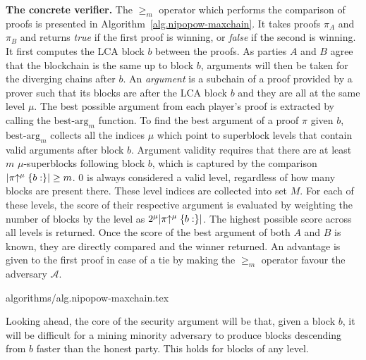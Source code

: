 \noindent
\textbf{The concrete verifier.}
The $\geq_m$ operator which performs the comparison of proofs is presented in
Algorithm~\ref{alg.nipopow-maxchain}. It takes proofs $\pi_A$ and $\pi_B$ and
returns \emph{true} if the first proof is winning, or \emph{false} if the second
is winning. It first computes the LCA block $b$ between the proofs. As parties
$A$ and $B$ agree that the blockchain is the same up to block $b$, arguments
will then be taken for the diverging chains after $b$. An \emph{argument} is a
subchain of a proof provided by a prover such that its blocks are after the LCA
block $b$ and they are all at the same level $\mu$. The best possible argument
from each player's proof is extracted by calling the $\text{best-arg}_m$
function.
To find the best argument of a proof $\pi$ given $b$, $\text{best-arg}_m$
collects all the indices $\mu$ which point to superblock levels that contain
valid arguments after block $b$. Argument validity requires that there are at
least $m$ $\mu$-superblocks following block $b$, which is captured by the
comparison $|\pi\negthickspace\uparrow^\mu\{b:\}| \geq m$. $0$ is always considered a valid
level, regardless of how many blocks are present there. These level indices are
collected into set $M$. For each of these levels, the score of their respective
argument is evaluated by weighting the number of blocks by the level as
$2^\mu|\pi\negthickspace\uparrow^\mu\{b:\}|$. The highest possible score across all levels is
returned. Once the score of the best argument of both $A$ and $B$ is known, they
are directly compared and the winner returned.  An advantage is given to the
first proof in case of a tie by making the $\geq_m$ operator favour the
adversary $\mathcal{A}$.

{algorithms/alg.nipopow-maxchain.tex}

Looking ahead, the core of the security argument will be that, given a block
$b$, it will be difficult for a mining minority adversary to produce blocks
descending from $b$ faster than the honest party. This holds for blocks of any
level.
